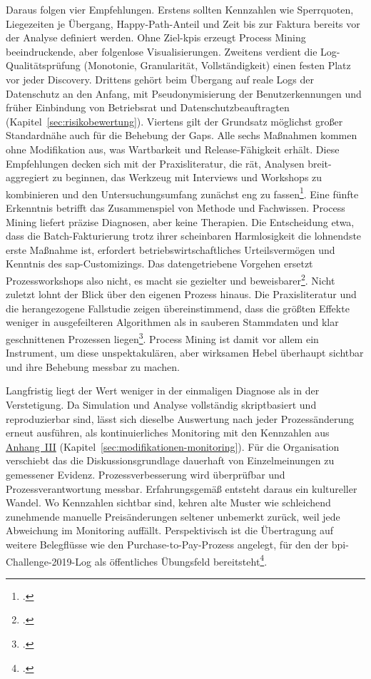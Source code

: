 Daraus folgen vier Empfehlungen. Erstens sollten Kennzahlen wie Sperrquoten, Liegezeiten je Übergang, Happy-Path-Anteil und Zeit bis zur Faktura bereits vor der Analyse definiert werden. Ohne Ziel-\gls{kpi}s erzeugt Process Mining beeindruckende, aber folgenlose Visualisierungen. Zweitens verdient die Log-Qualitätsprüfung (Monotonie, Granularität, Vollständigkeit) einen festen Platz vor jeder Discovery. Drittens gehört beim Übergang auf reale Logs der Datenschutz an den Anfang, mit Pseudonymisierung der Benutzerkennungen und früher Einbindung von Betriebsrat und Datenschutzbeauftragten (Kapitel~\ref{sec:risikobewertung}). Viertens gilt der Grundsatz möglichst großer Standardnähe auch für die Behebung der Gaps. Alle sechs Maßnahmen kommen ohne Modifikation aus, was Wartbarkeit und Release-Fähigkeit erhält. Diese Empfehlungen decken sich mit der Praxisliteratur, die rät, Analysen breit-aggregiert zu beginnen, das Werkzeug mit Interviews und Workshops zu kombinieren und den Untersuchungsumfang zunächst eng zu fassen\footcite[Vgl.][S.~71 f.]{adolfsson2026o2c}. Eine fünfte Erkenntnis betrifft das Zusammenspiel von Methode und Fachwissen. Process Mining liefert präzise Diagnosen, aber keine Therapien. Die Entscheidung etwa, dass die Batch-Fakturierung trotz ihrer scheinbaren Harmlosigkeit die lohnendste erste Maßnahme ist, erfordert betriebswirtschaftliches Urteilsvermögen und Kenntnis des \gls{sap}-Customizings. Das datengetriebene Vorgehen ersetzt Prozessworkshops also nicht, es macht sie gezielter und beweisbarer\footcite[Vgl.][S.~71 f.]{adolfsson2026o2c}. Nicht zuletzt lohnt der Blick über den eigenen Prozess hinaus. Die Praxisliteratur und die herangezogene Fallstudie zeigen übereinstimmend, dass die größten Effekte weniger in ausgefeilteren Algorithmen als in sauberen Stammdaten und klar geschnittenen Prozessen liegen\footcites(Vgl.)()[S.~110 ff.]{nadukuru2024o2c}[S.~71 f.]{adolfsson2026o2c}. Process Mining ist damit vor allem ein Instrument, um diese unspektakulären, aber wirksamen Hebel überhaupt sichtbar und ihre Behebung messbar zu machen.

Langfristig liegt der Wert weniger in der einmaligen Diagnose als in der Verstetigung. Da Simulation und Analyse vollständig skriptbasiert und reproduzierbar sind, lässt sich dieselbe Auswertung nach jeder Prozessänderung erneut ausführen, als kontinuierliches Monitoring mit den Kennzahlen aus \hyperref[anh:kennzahlen]{Anhang~III} (Kapitel~\ref{sec:modifikationen-monitoring}). Für die Organisation verschiebt das die Diskussionsgrundlage dauerhaft von Einzelmeinungen zu gemessener Evidenz. Prozessverbesserung wird überprüfbar und Prozessverantwortung messbar. Erfahrungsgemäß entsteht daraus ein kultureller Wandel. Wo Kennzahlen sichtbar sind, kehren alte Muster wie schleichend zunehmende manuelle Preisänderungen seltener unbemerkt zurück, weil jede Abweichung im Monitoring auffällt. Perspektivisch ist die Übertragung auf weitere Belegflüsse wie den Purchase-to-Pay-Prozess angelegt, für den der \gls{bpi}-Challenge-2019-Log als öffentliches Übungsfeld bereitsteht\footcite[Vgl.][]{vandongen2019bpi}.

